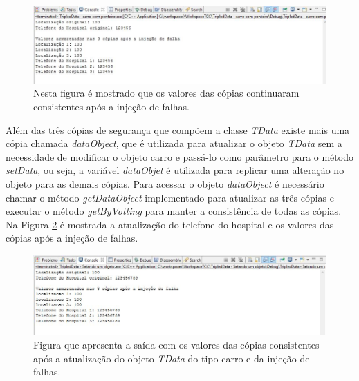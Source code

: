 \begin{figure}[H]
	\centering
	\includegraphics[width=1.0\textwidth]{figuras/tdataPonteiro.jpg}
	\caption[Valores das cópias consistentes após a injeção de falhas com ponteiro.]{Nesta figura é mostrado que os valores das cópias continuaram consistentes após a injeção de falhas.}
	\label{Img:tdataPonteiro}	
\end{figure}

Além das três cópias de segurança que compõem a classe \textit{TData} existe mais uma cópia chamada \textit{dataObject}, que é utilizada para atualizar o objeto \textit{TData} sem a necessidade de modificar o objeto carro e passá-lo como parâmetro para o método \textit{setData}, ou seja, a variável \textit{dataObjet} é utilizada para replicar uma alteração no objeto para as demais cópias. Para acessar o objeto \textit{dataObject}  é necessário chamar o método \textit{getDataObject} implementado para atualizar as três cópias e executar o método \textit{getByVotting} para manter a consistência de todas as cópias. Na Figura \ref{Img:tdataSetando} é mostrada a atualização do telefone do hospital e os valores das cópias após a injeção de falhas.

\begin{figure}[H]
	\centering
	\includegraphics[width=1.0\textwidth]{figuras/tdataSetando.jpg}
	\caption[Figura que apresenta a saída com os valores das cópias consistentes após a atualização do objeto \textit{TData} do tipo carro e da injeção de falhas.]{Figura que apresenta a saída com os valores das cópias consistentes após a atualização do objeto \textit{TData} do tipo carro e da injeção de falhas.}
	\label{Img:tdataSetando}	
\end{figure}